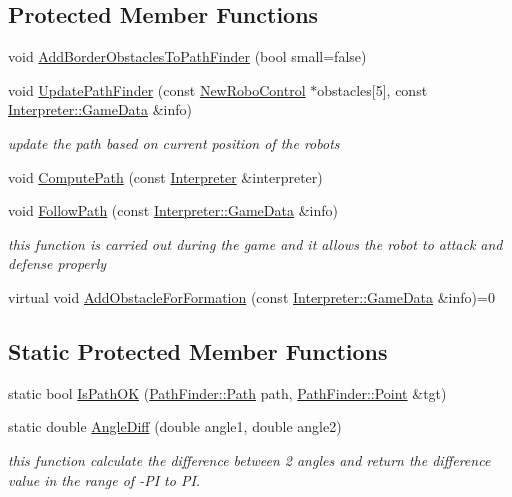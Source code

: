 \subsection*{Protected Member Functions}
\begin{DoxyCompactItemize}
\item 
void \hyperlink{classTeamRobot_acf4c435c98bc406744a12cd140d6631d}{AddBorderObstaclesToPathFinder} (bool small=false)
\item 
void \hyperlink{classTeamRobot_a1216ffb71821002b6e6845390c990d5f}{UpdatePathFinder} (const \hyperlink{classNewRoboControl}{NewRoboControl} $\ast$obstacles\mbox{[}5\mbox{]}, const \hyperlink{structInterpreter_1_1GameData}{Interpreter::GameData} \&info)
\begin{DoxyCompactList}\small\item\em update the path based on current position of the robots \item\end{DoxyCompactList}\item 
void \hyperlink{classTeamRobot_a9ae431d9eeaa1d16fa28c636499ab553}{ComputePath} (const \hyperlink{classInterpreter}{Interpreter} \&interpreter)
\item 
void \hyperlink{classTeamRobot_a02df00aae0a514badc93a9b2593be85f}{FollowPath} (const \hyperlink{structInterpreter_1_1GameData}{Interpreter::GameData} \&info)
\begin{DoxyCompactList}\small\item\em this function is carried out during the game and it allows the robot to attack and defense properly \item\end{DoxyCompactList}\item 
virtual void \hyperlink{classTeamRobot_a71ec65db46db1ac511fe17b668d4f192}{AddObstacleForFormation} (const \hyperlink{structInterpreter_1_1GameData}{Interpreter::GameData} \&info)=0
\end{DoxyCompactItemize}
\subsection*{Static Protected Member Functions}
\begin{DoxyCompactItemize}
\item 
static bool \hyperlink{classTeamRobot_afb5f9191ca185053af37c1ae1f8dcb17}{IsPathOK} (\hyperlink{classPathFinder_a269aba09b7b3208092f67f2bc02cf63e}{PathFinder::Path} path, \hyperlink{structPathFinder_1_1Point}{PathFinder::Point} \&tgt)
\item 
static double \hyperlink{classTeamRobot_a45d5d631b1e1e28c9c0f4ecbd47fdbde}{AngleDiff} (double angle1, double angle2)
\begin{DoxyCompactList}\small\item\em this function calculate the difference between 2 angles and return the difference value in the range of -\/PI to PI. \item\end{DoxyCompactList}\end{DoxyCompactItemize}
